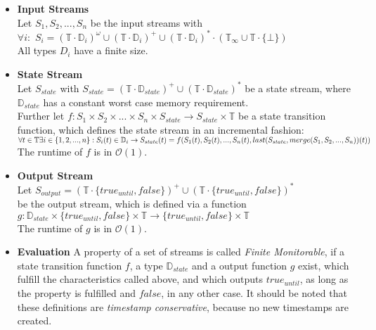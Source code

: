 		\begin{itemize}
			\item{\textbf{Input Streams}}\\
				Let $S_1, S_2, ..., S_n$ be the input streams with\\
				$\forall i:$ $S_i=(\mathbb{T}\cdot \mathbb{D}_i)^\omega\cup(\mathbb{T}\cdot \mathbb{D}_i)^+\cup(\mathbb{T}\cdot \mathbb{D}_i)^*\cdot(\mathbb{T}_\infty\cup\mathbb{T}\cdot\{\bot\})$\\
				All types $D_i$ have a finite size.
			\item{\textbf{State Stream}}\\
				\label{monitorability_state}
				Let $S_{state}$ with $S_{state}= (\mathbb{T}\cdot \mathbb{D}_{state})^+\cup(\mathbb{T}\cdot \mathbb{D}_{state})^*$
				be a state stream, where $\mathbb{D}_{state}$ has a constant worst case memory requirement.\\
				Further let $f: S_1 \times S_2 \times ... \times S_n \times S_{state}\rightarrow S_{state}\times \mathbb{T}$ be a state transition function, which defines the state stream in an incremental fashion:\newpage
				\begin{math}
					\forall t\in \mathbb T \exists i\in \{1,2,...,n\}: S_i(t)\in\mathbb D_i\\
					\rightarrow S_{state}(t)= f(S_1(t), S_2(t), ..., S_n(t), last(S_{state}, merge(S_1, S_2, ..., S_n))(t))
				\end{math}\\
				The runtime of $f$ is in $\mathcal{O}(1)$.
			\item{\textbf{Output Stream}}\\
				Let $S_{output}= (\mathbb{T}\cdot \{true_{until}, false\})^+\cup(\mathbb{T}\cdot \{true_{until}, false\})^*$\\
				be the output stream, which is defined via a function\\
				$g: \mathbb{D}_{state}\times\{true_{until}, false\}\times \mathbb{T}\rightarrow \{true_{until}, false\}\times \mathbb{T}$\\
				The runtime of $g$ is in $\mathcal{O}(1)$.
			\item{\textbf{Evaluation}}
				A property of a set of streams is called \emph{Finite Monitorable}, if a state transition function $f$, a type $\mathbb{D}_{state}$ and a output function $g$ exist, which fulfill the characteristics called above, and which outputs $true_{until}$, as long as the property is fulfilled and $false$, in any other case. It should be noted that these definitions are \emph{timestamp conservative}, because no new timestamps are created.

\end{itemize}
